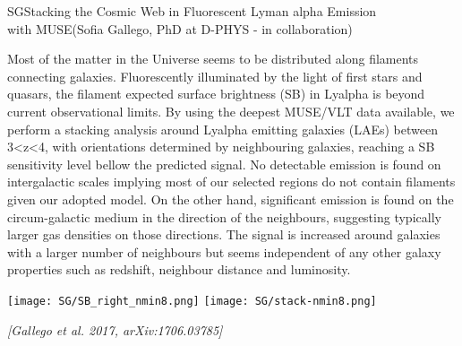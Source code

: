 \begin{section}{SG}{Stacking the Cosmic Web in Fluorescent Lyman alpha Emission
    \\ \hspace*{4cm} with MUSE}{(Sofia Gallego, PhD at D-PHYS - in collaboration)}
  \begin{minipage}[l]{\textwidth}

    {\small Most of the matter in the Universe seems to be distributed along
      filaments connecting galaxies. Fluorescently illuminated by the light of
      first stars and quasars, the filament expected surface brightness (SB) in
      Lyalpha is beyond current observational limits. By using the deepest
      MUSE/VLT data available, we perform a stacking analysis around Lyalpha
      emitting galaxies (LAEs) between 3<z<4, with orientations determined by
      neighbouring galaxies, reaching a SB sensitivity level bellow the
      predicted signal. No detectable emission is found on intergalactic
      scales implying most of our selected regions do not contain filaments
      given our adopted model. On the other hand, significant emission is
      found on the circum-galactic medium in the direction of the neighbours,
      suggesting typically larger gas densities on those directions. The
      signal is increased around galaxies with a larger number of neighbours
      but seems independent of any other galaxy properties such as redshift,
      neighbour distance and luminosity.}
  \end{minipage}

  \vspace{0.5cm}

  \begin{minipage}{\linewidth}
    \begin{center}
      \texttt{[image: SG/SB\_right\_nmin8.png]}
      \texttt{[image: SG/stack-nmin8.png]}
    \end{center}
  \end{minipage}

  \vspace{0.5cm}

  {\footnotesize \textit{[Gallego et al. 2017, arXiv:1706.03785]}}
\end{section}